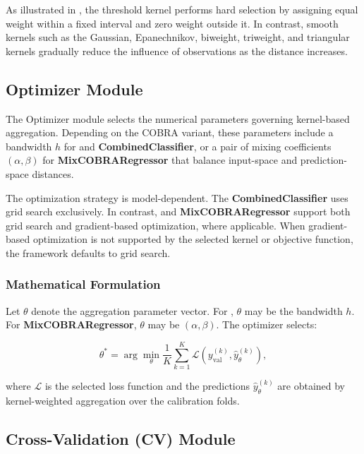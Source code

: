As illustrated in , the threshold kernel performs hard selection by assigning equal weight within a fixed interval and zero weight outside it. In contrast, smooth kernels such as the Gaussian, Epanechnikov, biweight, triweight, and triangular kernels gradually reduce the influence of observations as the distance increases.


\subsection{Optimizer Module}
\label{subsec:optimizer_module}

\hs The Optimizer module selects the numerical parameters governing kernel-based aggregation. Depending on the COBRA variant, these parameters include a bandwidth $h$ for \GradientCOBRA{} and \textbf{CombinedClassifier}, or a pair of mixing coefficients $(\alpha, \beta)$ for \textbf{MixCOBRARegressor} that balance input-space and prediction-space distances.

The optimization strategy is model-dependent. The \textbf{CombinedClassifier} uses grid search exclusively. In contrast, \GradientCOBRA{} and \textbf{MixCOBRARegressor} support both grid search and gradient-based optimization, where applicable. When gradient-based optimization is not supported by the selected kernel or objective function, the framework defaults to grid search.

\subsubsection*{Mathematical Formulation}

Let $\theta$ denote the aggregation parameter vector. For \GradientCOBRA{}, $\theta$ may be the bandwidth $h$. For \textbf{MixCOBRARegressor}, $\theta$ may be $(\alpha,\beta)$. The optimizer selects:

\[
    \theta^* = \arg\min_{\theta} \frac{1}{K}\sum_{k=1}^{K}
    \mathcal{L}\left(y_{\mathrm{val}}^{(k)}, \hat{y}_{\theta}^{(k)}\right),
\]

where $\mathcal{L}$ is the selected loss function and the predictions $\hat{y}_{\theta}^{(k)}$ are obtained by kernel-weighted aggregation over the calibration folds.

\subsection{Cross-Validation (CV) Module}
\label{subsec:validators_module}

